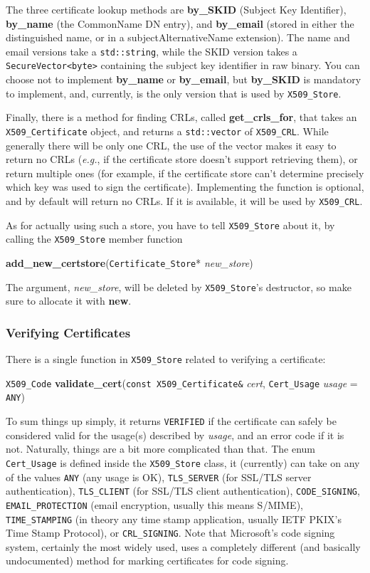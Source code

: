 \documentclass{article}
\newcommand{\function}[1]{\textbf{#1}}
\newcommand{\type}[1]{\texttt{#1}}
\renewcommand{\arg}[1]{\textsl{#1}}
\newcommand{\eg}[0]{\emph{e.g.}}
\begin{document}
The three certificate lookup methods are \function{by\_SKID} (Subject Key
Identifier), \function{by\_name} (the CommonName DN entry), and
\function{by\_email} (stored in either the distinguished name, or in a
subjectAlternativeName extension). The name and email versions take a
\type{std::string}, while the SKID version takes a \type{SecureVector<byte>}
containing the subject key identifier in raw binary. You can choose not to
implement \function{by\_name} or \function{by\_email}, but \function{by\_SKID}
is mandatory to implement, and, currently, is the only version that is used by
\type{X509\_Store}.

Finally, there is a method for finding CRLs, called \function{get\_crls\_for},
that takes an \type{X509\_Certificate} object, and returns a
\type{std::vector} of \type{X509\_CRL}. While generally there will be only one
CRL, the use of the vector makes it easy to return no CRLs (\eg, if the
certificate store doesn't support retrieving them), or return multiple ones
(for example, if the certificate store can't determine precisely which key was
used to sign the certificate). Implementing the function is optional, and by
default will return no CRLs. If it is available, it will be used by
\type{X509\_CRL}.

As for actually using such a store, you have to tell \type{X509\_Store} about
it, by calling the \type{X509\_Store} member function

\function{add\_new\_certstore}(\type{Certificate\_Store}* \arg{new\_store})

The argument, \arg{new\_store}, will be deleted by \type{X509\_Store}'s
destructor, so make sure to allocate it with \function{new}.

\subsubsection{Verifying Certificates}

There is a single function in \type{X509\_Store} related to verifying a
certificate:

\type{X509\_Code}
\function{validate\_cert}(\type{const X509\_Certificate\&} \arg{cert},
                          \type{Cert\_Usage} \arg{usage} = \type{ANY})

To sum things up simply, it returns \type{VERIFIED} if the certificate can
safely be considered valid for the usage(s) described by \arg{usage}, and an
error code if it is not. Naturally, things are a bit more complicated than
that. The enum \type{Cert\_Usage} is defined inside the \type{X509\_Store}
class, it (currently) can take on any of the values \type{ANY} (any usage is
OK), \type{TLS\_SERVER} (for SSL/TLS server authentication), \type{TLS\_CLIENT}
(for SSL/TLS client authentication), \type{CODE\_SIGNING},
\type{EMAIL\_PROTECTION} (email encryption, usually this means S/MIME),
\type{TIME\_STAMPING} (in theory any time stamp application, usually IETF
PKIX's Time Stamp Protocol), or \type{CRL\_SIGNING}. Note that Microsoft's code
signing system, certainly the most widely used, uses a completely different
(and basically undocumented) method for marking certificates for code signing.
\end{document}
